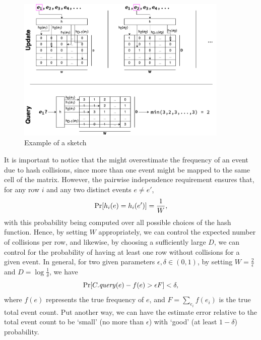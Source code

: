 \begin{figure}[htbp]
	\begin{center}
    \includegraphics[width=0.9\textwidth]{figures/cm-example}
	\end{center}
	\caption{Example of a \cm sketch}\label{fig:countminexample}
\end{figure}

It is important to notice that the \cm might overestimate the frequency of an event due to hash collisions, since more than one event might be mapped to the same cell of the matrix. However, the pairwise independence requirement ensures that, for any row $i$ and any two distinct events $e\neq e'$,
\begin{equation*}
\mathrm{Pr}[h_i(e)=h_i(e')] = \frac{1}{W},
\end{equation*}
with this probability being computed over all possible choices of the hash function.
Hence, by setting $W$ appropriately, we can control the expected number of collisions per row, and likewise, by choosing a sufficiently large $D$, we can control for the probability of having at least one row without collisions for a given event. In general, for two given parameters $\epsilon, \delta \in (0,1)$, by setting 
$W=\frac{2}{\epsilon}$ and $D=\log\frac{1}{\delta}$, we have
\begin{equation}
\label{eq:cm-prob}
\mathrm{Pr}[C.\mathit{query}(e) - f(e) > \epsilon F] < \delta,
\end{equation}
where $f(e)$ represents the true frequency of $e$, and $F=\sum_{e_i}f(e_i)$ is the true total event count. Put another way, we can have the estimate error relative to the total event count to be `small' (no more than $\epsilon$) with `good' (at least $1-\delta$) probability.

